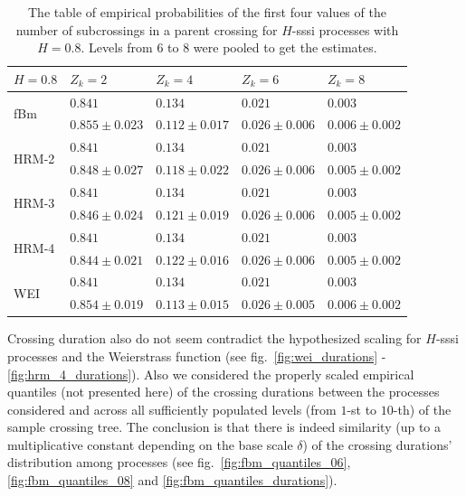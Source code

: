 \documentclass[a4paper]{article}
\begin{document}
\begin{table}[h]\begin{center}
	\begin{tabular}{l||l|l|l|l|}
					$H=0.8$ & $Z_k = 2$ & $Z_k = 4$ & $Z_k = 6$ & $Z_k = 8$ \\ \hline\hline
	\multirow{2}{*}{fBm} 	& $0.841$ & $0.134$ & $0.021$ & $0.003$ \\ \cline{2-5}
 							& $0.855\pm0.023$ & $0.112\pm0.017$ & $0.026\pm0.006$ & $0.006\pm0.002$ \\ \hline\hline
	\multirow{2}{*}{HRM-2} 	& $0.841$ & $0.134$ & $0.021$ & $0.003$ \\ \cline{2-5}
 							& $0.848\pm0.027$ & $0.118\pm0.022$ & $0.026\pm0.006$ & $0.005\pm0.002$ \\ \hline\hline
	\multirow{2}{*}{HRM-3} 	& $0.841$ & $0.134$ & $0.021$ & $0.003$ \\ \cline{2-5}
 							& $0.846\pm0.024$ & $0.121\pm0.019$ & $0.026\pm0.006$ & $0.005\pm0.002$ \\ \hline\hline
	\multirow{2}{*}{HRM-4} 	& $0.841$ & $0.134$ & $0.021$ & $0.003$ \\ \cline{2-5}
 							& $0.844\pm0.021$ & $0.122\pm0.016$ & $0.026\pm0.006$ & $0.005\pm0.002$ \\ \hline\hline
	\multirow{2}{*}{WEI} 	& $0.841$ & $0.134$ & $0.021$ & $0.003$ \\ \cline{2-5}
 							& $0.854\pm0.019$ & $0.113\pm0.015$ & $0.026\pm0.005$ & $0.006\pm0.002$ \\ \hline\hline
	\end{tabular}
	\caption{The table of empirical probabilities of the first four values of the number
	of subcrossings in a parent crossing for $H$-sssi processes with $H=0.8$. Levels from
	6 to 8 were pooled to get the estimates.}
\label{tbl:empirical_probs_02}
\end{center}\end{table}

Crossing duration also do not seem contradict the hypothesized scaling for $H$-sssi
processes and the Weierstrass function (see fig.~\ref{fig:wei_durations} - \ref{fig:hrm_4_durations}).
Also we considered the properly scaled empirical quantiles (not presented here) of
the crossing durations between the processes considered and across all sufficiently
populated levels (from $1$-st to $10$-th) of the sample crossing tree. The conclusion
is that there is indeed similarity (up to a multiplicative constant depending on
the base scale $\delta$) of the crossing durations' distribution among processes
(see fig.~\ref{fig:fbm_quantiles_06}, \ref{fig:fbm_quantiles_08} and \ref{fig:fbm_quantiles_durations}).
\end{document}
